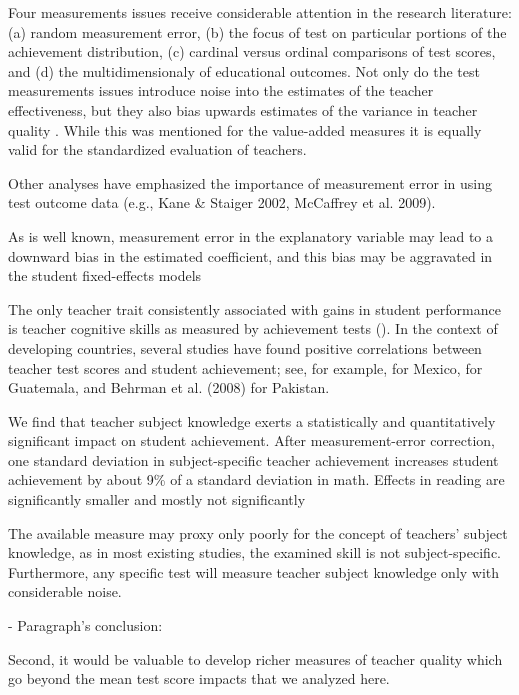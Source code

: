 Four measurements issues receive considerable attention in the research literature: (a) random measurement error, (b) the focus of test on particular portions of the achievement distribution, (c) cardinal versus ordinal comparisons of test scores, and (d) the multidimensionaly of educational outcomes. Not only do the test measurements issues introduce noise into the estimates of the teacher effectiveness, but they also bias upwards estimates of the variance in teacher quality \citep{Hanushek_et_al_2012}. While this was mentioned for the value-added measures it is equally valid for the standardized evaluation of teachers.


Other analyses have emphasized the importance of measurement error in using test outcome data (e.g., Kane & Staiger 2002, McCaffrey et al. 2009).

As is well known, measurement error in the explanatory variable may lead to a downward bias in the estimated coefficient, and this bias may be aggravated in the student fixed-effects models \citep{Angrist_et_al_1999}

The only teacher trait consistently associated with gains in student performance is teacher cognitive skills as measured by achievement tests (\citep{Hanushek_et_al_2006, Rockoff_et_al_2011}). In the context of developing countries, several studies have found positive correlations between teacher test scores and student achievement; see, for example, \citep{Santibanez_2006} for Mexico, \citep{Marshall_2009} for Guatemala, and Behrman et al. (2008) for Pakistan.


We find that teacher subject knowledge exerts a statistically and quantitatively significant impact on student achievement. After measurement-error correction, one standard deviation in subject-specific teacher achievement increases student achievement by about 9\% of a standard deviation in math. Effects in reading are significantly smaller and mostly not significantly \citep{Metzler_et_al_2012}


The available measure may proxy only poorly for the concept of teachers' subject knowledge, as in most existing studies, the examined skill is not subject-specific. Furthermore, any specific test will measure teacher subject knowledge only with considerable noise. \citep{Metzler_et_al_2012}



- Paragraph's conclusion: 

Second, it would be valuable to develop richer measures of teacher quality which go beyond the mean test score impacts that we analyzed here. \citep{Chetty_et_al_2014a}

